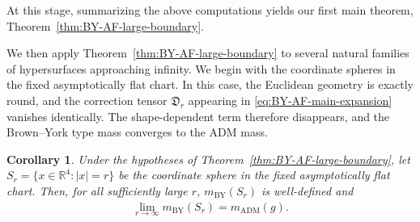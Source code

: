 \documentclass[10pt]{amsart}
\newcommand{\ADM}{\mathrm{ADM}}
\newcommand{\BY}{\mathrm{BY}}
\theoremstyle{plain}
\newtheorem{corollary}[theorem]{Corollary}
\theoremstyle{remark}
\begin{document}
	At this stage, summarizing the above computations yields our first main theorem, Theorem~\ref{thm:BY-AF-large-boundary}.
	
	\medskip
	
	We then apply Theorem~\ref{thm:BY-AF-large-boundary} to several natural
	families of hypersurfaces approaching infinity. We begin with the
	coordinate spheres in the fixed asymptotically flat chart. In this
	case, the Euclidean geometry is exactly round, and the correction tensor
	$\mathfrak D_r$ appearing in \eqref{eq:BY-AF-main-expansion} vanishes
	identically. The shape-dependent term therefore disappears, and the
	Brown--York type mass converges to the ADM mass.
	
	\begin{corollary}\label{cor:BY-AF-coordinate-spheres}
		Under the hypotheses of Theorem~\ref{thm:BY-AF-large-boundary}, let
		$S_r=\{x\in\mathbb R^4:|x|=r\}$ be the coordinate sphere in the fixed
		asymptotically flat chart. Then, for all sufficiently large $r$,
		$m_{\BY}(S_r)$ is well-defined and
		\begin{align}
			\lim_{r\to\infty}m_{\BY}(S_r)
			=
			m_{\ADM}(g).
		\end{align}
	\end{corollary}
	
\end{document}
